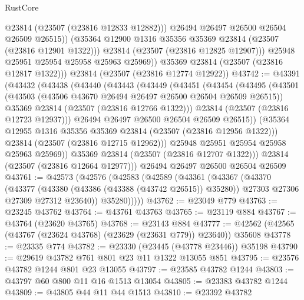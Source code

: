 \begin{lexlean}{RustCore}
\begin{coremodule}
                  @23814
                  (@23507 (@23816 @12833 @12882)))
                @26494
                @26497
                @26500
                @26504
                @26509
                @26515))
            (@35364 @12900 @1316 @35356 @35369 @23814 (@23507 (@23816 @12901 @1322)))
            @23814
            (@23507 (@23816 @12825 @12907)))
          @25948
          @25951
          @25954
          @25958
          @25963
          @25969))
      @35369
      @23814
      (@23507 (@23816 @12817 @1322)))
    @23814
    (@23507 (@23816 @12774 @12922))
@43742 := @43391
    (@43432
      (@43438
        (@43440
          (@43443
            (@43449
              (@43451
                (@43454
                  (@43495
                    (@43501
                      (@43503 (@43506 @43670 @26494 @26497 @26500 @26504 @26509 @26515))
                      @35369
                      @23814
                      (@23507 (@23816 @12766 @1322)))
                    @23814
                    (@23507 (@23816 @12723 @12937)))
                  @26494
                  @26497
                  @26500
                  @26504
                  @26509
                  @26515))
              (@35364 @12955 @1316 @35356 @35369 @23814 (@23507 (@23816 @12956 @1322)))
              @23814
              (@23507 (@23816 @12715 @12962)))
            @25948
            @25951
            @25954
            @25958
            @25963
            @25969))
        @35369
        @23814
        (@23507 (@23816 @12707 @1322)))
      @23814
      (@23507 (@23816 @12664 @12977)))
    @26494
    @26497
    @26500
    @26504
    @26509
@43761 := @42573
    (@42576
      (@42583
        (@42589
          (@43361
            (@43367
              (@43370
                (@43377
                  (@43380 (@43386 (@43388 (@43742 @26515)) @35280))
                  @27303
                  @27306
                  @27309
                  @27312
                  @23640))
              @35280)))))
@43762 := @23049 @779
@43763 := @23245 @43762
@43764 := @43761 @43763
@43765 := @23119 @884
@43767 := @43764 (@23620 @43765)
@43768 := @23143 @884
@43777 := @42562 (@42565 (@43767 (@23624 @43768) (@23629 (@23631 @779)) @23640)) @35608
@43778 := @23335 @774
@43782 := @23330 (@23445 (@43778 @23446)) @35198
@43790 := @29619 @43782 @761 @801 @23 @11 @1322 @13055 @851
@43795 := @23576 @43782 @1244 @801 @23 @13055
@43797 := @23585 @43782 @1244
@43803 := @43797 @60 @800 @11 @16 @1513 @13054
@43805 := @23383 @43782 @1244
@43809 := @43805 @44 @11 @44 @1513
@43810 := @23392 @43782

\end{coremodule}
\end{lexlean}
